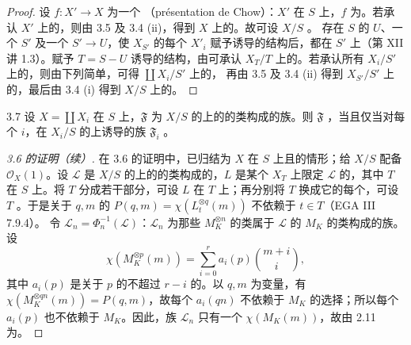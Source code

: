 \begin{proof}
设 $f:X'\to X$ 为一个 （présentation de Chow）：$X'$ 在 $S$ 上，$f$ 为。若承认 $X'$ 上的，则由 3.5 及 3.4 (ii)，得到 $X$ 上的。故可设 $X/S$ 。
存在 $S$ 的 $U$、一个 $S'$ 及一个 $S'\to U$，使 $X_{S'}$ 的每个 $X'_i$ 赋予诱导的结构后，都在 $S'$ 上（第 XII 讲 1.3）。赋予 $T=S-U$ 诱导的结构，由可承认 $X_T/T$ 上的。若承认所有 $X_i/S'$ 上的，则由下列简单，可得 $\coprod X_i/S'$ 上的，
再由 3.5 及 3.4 (ii) 得到 $X_{S'}/S'$ 上的，最后由 3.4 (i) 得到 $X/S$ 上的。
\end{proof}
\begin{SGAresult}{}{3.7}
设 $X=\coprod X_i$ 在 $S$ 上，$\mathfrak F$ 为 $X/S$ 的上的的类构成的族。则 $\mathfrak F$ ，当且仅当对每个 $i$，在 $X_i/S$ 的上诱导的族 $\mathfrak F_i$ 。
\end{SGAresult}
\begin{proof}[ 3.6 的证明（续）]
在 3.6 的证明中，已归结为 $X$ 在 $S$ 上且的情形；给 $X/S$ 配备 $\mathcal O_X(1)$。设 $\mathscr L$ 是 $X/S$ 的上的的类构成的，$L$ 是某个 $X_T$ 上限定 $\mathscr L$ 的，其中 $T$ 在 $S$ 上。将 $T$ 分成若干部分，可设 $L$ 在 $T$ 上；再分别将 $T$ 换成它的每个，可设 $T$ 。于是关于 $q,m$ 的 $P(q,m)=\chi(L_t^{\otimes q}(m))$ 不依赖于 $t\in T$（EGA III 7.9.4）。
令 $\mathscr L_n=\Phi_n^{-1}(\mathscr L)$：$\mathscr L_n$ 为那些 $M_K^{\otimes n}$ 的类属于 $\mathscr L$ 的 $M_K$ 的类构成的族。设
\[\chi(M_K^{\otimes p}(m))=\sum_{i=0}^r a_i(p)\binom{m+i}{i},\]
其中 $a_i(p)$ 是关于 $p$ 的不超过 $r-i$ 的。以 $q,m$ 为变量，有 $\chi(M_K^{\otimes qn}(m))=P(q,m)$，故每个 $a_i(qn)$ 不依赖于 $M_K$ 的选择；所以每个 $a_i(p)$ 也不依赖于 $M_K$。因此，族 $\mathscr L_n$ 只有一个 $\chi(M_K(m))$，故由 2.11 为。
\end{proof}
